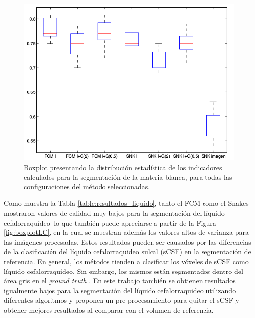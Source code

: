 \begin{figure}[H]
	\centering
	\includegraphics[scale=0.5]{images/BoxPlotMB.png}
	\caption{Boxplot presentando la distribución estadística de los indicadores calculados para la segmentación de la materia blanca, para todas las configuraciones del método seleccionadas.}
	\label{fig:boxplotMB}
\end{figure}


Como muestra la Tabla \ref{table:resultados_liquido}, tanto el FCM como el Snakes mostraron valores de calidad muy bajos para la segmentación del líquido cefalorraquídeo, lo que también puede apreciarse a partir de la Figura \ref{fig:boxplotLC}, en la cual se muestran además los valores altos de varianza  para las imágenes procesadas.  Estos resultados pueden ser causados por las diferencias de la clasificación del líquido cefalorraquideo sulcal (sCSF) en la segmentación de referencia. En general, los métodos tienden a clasificar los vóxeles de sCSF como líquido cefalorraquídeo. Sin embargo, los mismos están segmentados dentro del área gris en el \emph{ground truth} \citep{valverde2015comparison}. En este trabajo también  se obtienen resultados igualmente bajos para la segmentación del líquido cefalorraquideo utilizando diferentes algoritmos y proponen un pre procesamiento para quitar el sCSF y obtener mejores resultados al comparar con el volumen de referencia.

